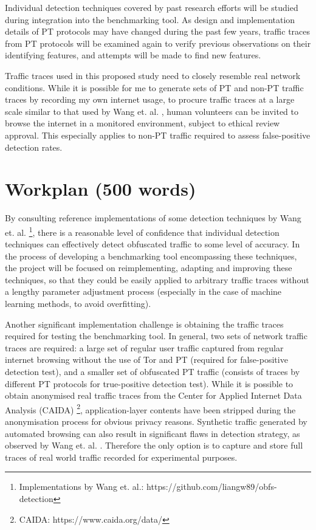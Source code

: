 \documentclass[11pt]{article}
\begin{document}
Individual detection techniques covered by past research efforts will be studied during integration into the benchmarking tool. As design and implementation details of PT protocols may have changed during the past few years, traffic traces from PT protocols will be examined again to verify previous observations on their identifying features, and attempts will be made to find new features.

Traffic traces used in this proposed study need to closely resemble real network conditions. While it is possible for me to generate sets of PT and non-PT traffic traces by recording my own internet usage, to procure traffic traces at a large scale similar to that used by Wang et. al. \cite{wang2015seeing}, human volunteers can be invited to browse the internet in a monitored environment, subject to ethical review approval. This especially applies to non-PT traffic required to assess false-positive detection rates.


\section{Workplan (500 words)}

By consulting reference implementations of some detection techniques by Wang et. al. \cite{wang2015seeing} \footnote{Implementations by Wang et. al.: https://github.com/liangw89/obfs-detection}, there is a reasonable level of confidence that individual detection techniques can effectively detect obfuscated traffic to some level of accuracy.  In the process of developing a benchmarking tool encompassing these techniques, the project will be focused on reimplementing, adapting and improving these techniques, so that they could be easily applied to arbitrary traffic traces without a lengthy parameter adjustment process (especially in the case of machine learning methods, to avoid overfitting). 

Another significant implementation challenge is obtaining the traffic traces required for testing the benchmarking tool. In general, two sets of network traffic traces are required: a large set of regular user traffic captured from regular internet browsing without the use of Tor and PT (required for false-positive detection test), and a smaller set of obfuscated PT traffic (consists of traces by different PT protocols for true-positive detection test). While it is possible to obtain anonymised real traffic traces from the Center for Applied Internet Data Analysis (CAIDA) \footnote{CAIDA: https://www.caida.org/data/}, application-layer contents have been stripped during the anonymisation process for obvious privacy reasons. Synthetic traffic generated by automated browsing can also result in significant flaws in detection strategy, as observed by Wang et. al. \cite[Sec. 6.1]{wang2015seeing}. Therefore the only option is to capture and store full traces of real world traffic recorded for experimental purposes.
\end{document}
